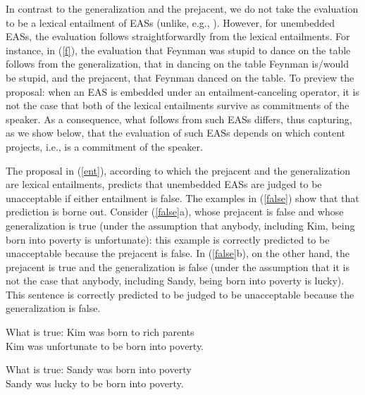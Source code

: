 \documentclass[11pt,fleqn]{article}
\def\infelic{{\leavevmode\llap{\#}}}
\newcommand{\6}{\mbox{$[\hspace*{-.6mm}[$}}
\newcommand{\9}{\mbox{$]\hspace*{-.6mm}]$}}
\begin{document}
In contrast to the generalization and the prejacent, we do not take the evaluation to be a lexical entailment of EASs (unlike, e.g., \citealt{barker02}). However, for unembedded EASs, the evaluation follows straightforwardly from the lexical entailments. For instance, in (\ref{f}), the evaluation that Feynman was stupid to dance on the table follows from the generalization, that in dancing on the table Feynman is/would be stupid, and the prejacent, that Feynman danced on the table. To preview the proposal: when an EAS is embedded under an entailment-canceling operator, it is not the case that both of the lexical entailments survive as commitments of the speaker. As a consequence, what follows from such EASs differs, thus capturing, as we show below, that the evaluation of such EASs depends on which content projects, i.e., is a commitment of the speaker.

The proposal in (\ref{ent}), according to which the prejacent and the generalization are lexical entailments, predicts that unembedded EASs are judged to be unacceptable if either entailment is false. The examples in (\ref{false}) show that that prediction is borne out. Consider (\ref{false}a), whose prejacent is false and whose generalization is true (under the assumption that anybody, including Kim, being born into poverty is unfortunate): this example is correctly predicted to be unacceptable because the prejacent is false. In (\ref{false}b), on the other hand, the prejacent is true and the generalization is false (under the assumption that it is not the case that anybody, including Sandy, being born into poverty is lucky). This sentence is correctly predicted to be judged to be unacceptable because the generalization is false. 

\begin{exe}
\ex\label{false}
\begin{xlist}
\ex What is true: Kim was born to rich parents
\\ \infelic Kim was unfortunate to be born into poverty.

\ex What is true: Sandy was born into poverty
\\ \infelic Sandy was lucky to be born into poverty.

\end{xlist}
\end{exe}
\end{document}
